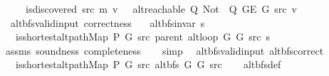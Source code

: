 \begin{isabellebody}
\ \ \ \ {\isasymnot}\ is{\isacharunderscore}{\kern0pt}discovered\ src\ m\ v\ {\isasymlongrightarrow}\ {\isasymnot}\ alt{\isacharunderscore}{\kern0pt}reachable\ Q\ {\isacharparenleft}{\kern0pt}Not\ {\isasymcirc}\ Q{\isacharparenright}{\kern0pt}\ {\isacharparenleft}{\kern0pt}G{\isachardot}{\kern0pt}E\ G{\isacharparenright}{\kern0pt}\ src\ v{\isachardoublequoteclose}\isanewline
\isanewline
{}\isamarkupfalse%
\ {\isacharparenleft}{\kern0pt}\ alt{\isacharunderscore}{\kern0pt}bfs{\isacharunderscore}{\kern0pt}valid{\isacharunderscore}{\kern0pt}input{\isacharparenright}{\kern0pt}\ correctness{\isacharcolon}{\kern0pt}\isanewline
\ \ \ {\isachardoublequoteopen}alt{\isacharunderscore}{\kern0pt}bfs{\isacharunderscore}{\kern0pt}invar{\isacharprime}{\kern0pt}{\isacharprime}{\kern0pt}\ s{\isachardoublequoteclose}\isanewline
\ \ \ {\isachardoublequoteopen}is{\isacharunderscore}{\kern0pt}shortest{\isacharunderscore}{\kern0pt}alt{\isacharunderscore}{\kern0pt}path{\isacharunderscore}{\kern0pt}Map\ P{\isacharprime}{\kern0pt}{\isacharprime}{\kern0pt}\ G\ src\ {\isacharparenleft}{\kern0pt}parent\ {\isacharparenleft}{\kern0pt}alt{\isacharunderscore}{\kern0pt}loop\ G{}\ G{}\ src\ s{\isacharparenright}{\kern0pt}{\isacharparenright}{\kern0pt}{\isachardoublequoteclose}\isanewline
%
\isadelimproof
\ \ %
\endisadelimproof
%
\isatagproof
{}\isamarkupfalse%
\ assms\ soundness\ completeness\isanewline
\ \ \isamarkupfalse%
\ simp%
\endisatagproof
{\isafoldproof}%
%
\isadelimproof
\isanewline
%
\endisadelimproof
\isanewline
{}\isamarkupfalse%
\ {\isacharparenleft}{\kern0pt}\ alt{\isacharunderscore}{\kern0pt}bfs{\isacharunderscore}{\kern0pt}valid{\isacharunderscore}{\kern0pt}input{\isacharparenright}{\kern0pt}\ alt{\isacharunderscore}{\kern0pt}bfs{\isacharunderscore}{\kern0pt}correct{\isacharcolon}{\kern0pt}\isanewline
\ \ \ {\isachardoublequoteopen}is{\isacharunderscore}{\kern0pt}shortest{\isacharunderscore}{\kern0pt}alt{\isacharunderscore}{\kern0pt}path{\isacharunderscore}{\kern0pt}Map\ P{\isacharprime}{\kern0pt}{\isacharprime}{\kern0pt}\ G\ src\ {\isacharparenleft}{\kern0pt}alt{\isacharunderscore}{\kern0pt}bfs\ G{}\ G{}\ src{\isacharparenright}{\kern0pt}{\isachardoublequoteclose}\isanewline
%
\isadelimproof
\ \ %
\endisadelimproof
%
\isatagproof
{}\isamarkupfalse%
\ alt{\isacharunderscore}{\kern0pt}bfs{\isacharunderscore}{\kern0pt}def\isanewline
\ \ \isamarkupfalse%

\end{isabellebody}
